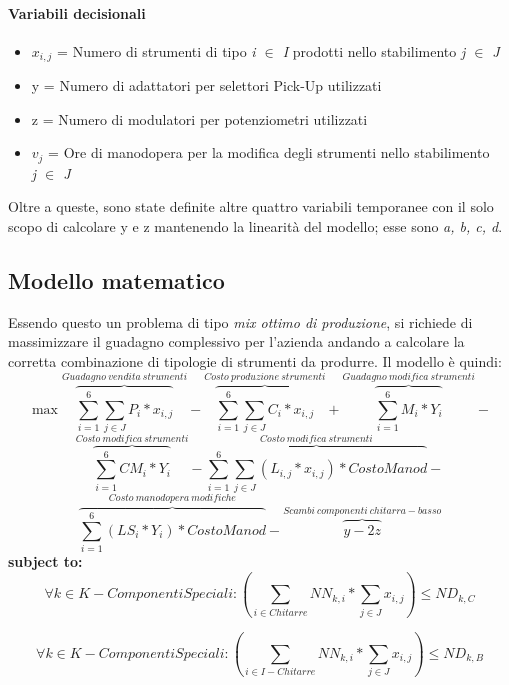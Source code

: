 \paragraph*{Variabili decisionali}
\begin{itemize}
\item[] $x_{i,j}$ = Numero di strumenti di tipo \textit{i $\in$ I} prodotti nello stabilimento \textit{j $\in$ J}
\item[] y = Numero di adattatori per selettori Pick-Up utilizzati
\item[] z = Numero di modulatori per potenziometri utilizzati
\item[] $v_j$ = Ore di manodopera per la modifica degli strumenti nello stabilimento \\ \textit{j $\in$ J}
\end{itemize}
Oltre a queste, sono state definite altre quattro variabili temporanee con il solo scopo di calcolare y e z mantenendo la linearità del modello; esse sono \textit{a, b, c, d}.

\subsection{Modello matematico}
Essendo questo un problema di tipo \textit{mix ottimo di produzione}, si richiede di massimizzare il guadagno complessivo per l'azienda andando a calcolare la corretta combinazione di tipologie di strumenti da produrre. Il modello è quindi:
\[
\max \overbrace{\sum_{i=1}^{6} \sum_{j\in J} P_i*x_{i,j}}^{Guadagno\ vendita\ strumenti} - \overbrace{\sum_{i=1}^{6} \sum_{j\in J} C_i*x_{i,j}}^{Costo\ produzione\ strumenti} + \overbrace{\sum_{i=1}^{6} M_i*Y_i}^{Guadagno\ modifica\ strumenti} -\]
\[
\overbrace{\sum_{i=1}^{6} CM_i*Y_i}^{Costo\ modifica\ strumenti} - \overbrace{\sum_{i=1}^{6} \sum_{j\in J} (L_{i,j}*x_{i,j})*CostoManod}^{Costo\ modifica\ strumenti} -
\]
\[
\overbrace{\sum_{i=1}^{6} (LS_i*Y_i)*CostoManod}^{Costo\ manodopera\ modifiche} - \overbrace{y - 2z}^{Scambi\ componenti\ chitarra-basso}
\]
\textbf{subject to:} \\
\begin{equation} 
\label{vinc1}
\forall k \in K - ComponentiSpeciali : \left ( \sum_{i\in Chitarre} NN_{k,i}* \sum_{j\in J} x_{i,j} \right) \le ND_{k,C}
\end{equation}

\begin{equation} 
\label{vinc2}
\forall k \in K - ComponentiSpeciali : \left ( \sum_{i\in I-Chitarre} NN_{k,i}* \sum_{j\in J} x_{i,j} \right) \le ND_{k,B}
\end{equation}

